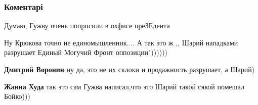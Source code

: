  
 
 
 
 
\subsubsection{Коментарі}
\label{sec:19_08_2021.fb.ljashenko_gleb.1.stranaua_sharij.cmt}

\begin{itemize}
 
Думаю, Гужву очень попросили в охфисе преЗЕдента

 
Ну Крюкова точно не единомышленник....
А так это ж ,, Шарий нападками разрушает Единый Могучий Фронт оппозиции"))))))

\begin{itemize}
 
\textbf{Дмитрий Воронин} ну да, это не их склоки и продажность разрушает, а Шарий)

 
\textbf{Жанна Худа} так это сам Гужва написал,что это Шарий такой сякой помешал Бойко)))

 

\end{itemize}
\end{itemize}
